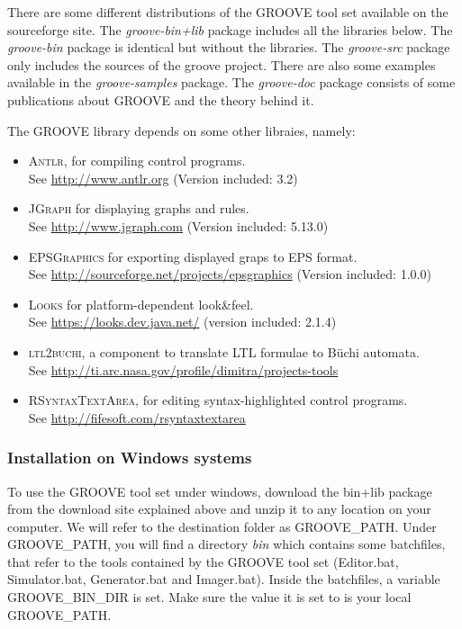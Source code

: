 There are some different distributions of the GROOVE tool set available on the
sourceforge site. The \emph{groove-bin+lib} package includes all the libraries
below. The \emph{groove-bin} package is identical but without the libraries.
The \emph{groove-src} package only includes the sources of the groove project.
There are also some examples available in the \emph{groove-samples} package.
The \emph{groove-doc} package consists of some publications about GROOVE and
the theory behind it.


The GROOVE library depends on some other libraies, namely:

\begin{itemize}\noitemsep
\item \textsc{Antlr}, for compiling control programs. \\
  See \url{http://www.antlr.org} (Version included: 3.2)
\item \textsc{JGraph} for displaying graphs and rules. \\
  See \url{http://www.jgraph.com} (Version included: 5.13.0)
\item \textsc{EPSGraphics} for exporting displayed graps to EPS format. \\
  See \url{http://sourceforge.net/projects/epsgraphics} (Version included: 1.0.0)
\item \textsc{Looks} for platform-dependent look\&feel. \\
  See \url{https://looks.dev.java.net/} (version included: 2.1.4)
\item \textsc{ltl2buchi}, a component to translate LTL formulae to
  B\"uchi automata. \\ See \url{http://ti.arc.nasa.gov/profile/dimitra/projects-tools}
\item \textsc{RSyntaxTextArea}, for editing syntax-highlighted control
  programs. \\ See \url{http://fifesoft.com/rsyntaxtextarea}
\end{itemize}


\subsubsection{Installation on Windows systems}

To use the GROOVE tool set under windows, download the bin+lib package from the
download site explained above and unzip it to any location on your computer. We
will refer to the destination folder as GROOVE\_PATH. Under GROOVE\_PATH, you
will find a directory \emph{bin} which contains some batchfiles, that refer to
the tools contained by the GROOVE tool set (Editor.bat, Simulator.bat,
Generator.bat and Imager.bat). Inside the batchfiles, a variable
GROOVE\_BIN\_DIR is set. Make sure the value it is set to is your local
GROOVE\_PATH.

